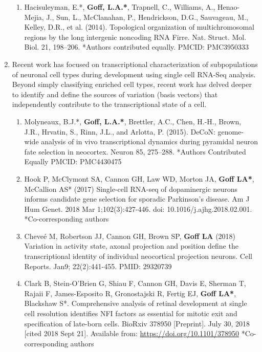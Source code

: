 \documentclass{nihbiosketch}
\begin{document}
\begin{enumerate}
\begin{enumerate}
\item	Hacisuleyman, E.*, \textbf{Goff, L.A.*}, Trapnell, C., Williams, A., Henao-Mejia, J., Sun, L., McClanahan, P., Hendrickson, D.G., Sauvageau, M., Kelley, D.R., et al. (2014). Topological organization of multichromosomal regions by the long intergenic noncoding RNA Firre. Nat. Struct. Mol. Biol. 21, 198–206. *Authors contributed equally. PMCID: PMC3950333

\end{enumerate}

\item Recent work has focused on transcriptional characterization of subpopulations of neuronal cell types during development using single cell RNA-Seq analysis. Beyond simply classifying enriched cell types, recent work has delved deeper to identify and define the sources of variation (basis vectors) that independently contribute to the transcriptional state of a cell.

\begin{enumerate}
\item	Molyneaux, B.J.*, \textbf{Goff, L.A.*}, Brettler, A.C., Chen, H.-H., Brown, J.R., Hrvatin, S., Rinn, J.L., and Arlotta, P. (2015). DeCoN: genome-wide analysis of in vivo transcriptional dynamics during pyramidal neuron fate selection in neocortex. Neuron 85, 275–288. *Authors Contributed Equally PMCID: PMC4430475

\item	Hook P, McClymont SA, Cannon GH, Law WD, Morton JA, \textbf{Goff LA*}, McCallion AS* (2017) Single-cell RNA-seq of dopaminergic neurons informs candidate gene selection for sporadic Parkinson's disease. Am J Hum Genet. 2018 Mar 1;102(3):427-446. doi: 10.1016/j.ajhg.2018.02.001. *Co-corresponding authors

\item	Cheveé M, Robertson JJ, Cannon GH, Brown SP, \textbf{Goff LA }(2018) Variation in activity state, axonal projection and position define the transcriptional identity of individual neocortical projection neurons. Cell Reports. Jan9; 22(2):441-455. PMID: 29320739

\item Clark B, Stein-O’Brien G, Shiau F, Cannon GH, Davis E, Sherman T, Rajaii F, James-Esposito R, Gronostajski R, Fertig EJ, \textbf{Goff LA*}, Blackshaw S*. Comprehensive analysis of retinal development at single cell resolution identifies NFI factors as essential for mitotic exit and specification of late-born cells. BioRxiv 378950 [Preprint]. July 30, 2018 [cited 2018 Sept 21]. Available from: \url{https://doi.org/10.1101/378950} *Co-corresponding authors

\end{enumerate}

\end{enumerate}
\end{document}
